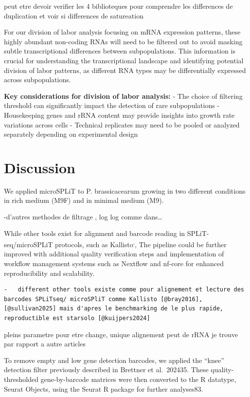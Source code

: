 \documentclass[
  11pt,
  a4paper,
]{report}
\begin{document}
peut etre devoir verifier les 4 biblioteques pour comprendre les
differences de duplication et voir si differences de satureation

For our division of labor analysis focusing on mRNA expression patterns,
these highly abundant non-coding RNAs will need to be filtered out to
avoid masking subtle transcriptional differences between subpopulations.
This information is crucial for understanding the transcriptional
landscape and identifying potential division of labor patterns, as
different RNA types may be differentially expressed across
subpopulations.

\textbf{Key considerations for division of labor analysis:} - The choice
of filtering threshold can significantly impact the detection of rare
subpopulations - Housekeeping genes and rRNA content may provide
insights into growth rate variations across cells - Technical replicates
may need to be pooled or analyzed separately depending on experimental
design


\chapter{Discussion}\label{discussion}

We applied microSPLiT to P. brassicacearum growing in two different
conditions in rich medium (M9F) and in minimal medium (M9).

-d'autres methodes de filtrage , log log comme dans\ldots{}

While other tools exist for alignment and barcode reading in
SPLiT-seq/microSPLiT protocols, such as
Kallisto\textsuperscript{,},
The pipeline could be further improved with additional quality
verification steps and implementation of workflow management systems
such as Nextflow and nf-core for enhanced reproducibility and
scalability.

\begin{verbatim}
-   different other tools existe comme pour alignement et lecture des barcodes SPLiTseq/ microSPliT comme Kallisto [@bray2016], [@sullivan2025] mais d'apres le benchmarking de le plus rapide, reproductible est starsolo [@kuijpers2024]
\end{verbatim}

pleins parametre pour etre change, unique alignement peut de rRNA je
trouve par rapport a autre articles

To remove empty and low gene detection barcodes, we applied the ``knee''
detection filter previously described in Brettner et al.~202435. These
quality-thresholded gene-by-barcode matrices were then converted to the
R datatype, Seurat Objects, using the Seurat R package for further
analyses83.
\end{document}

